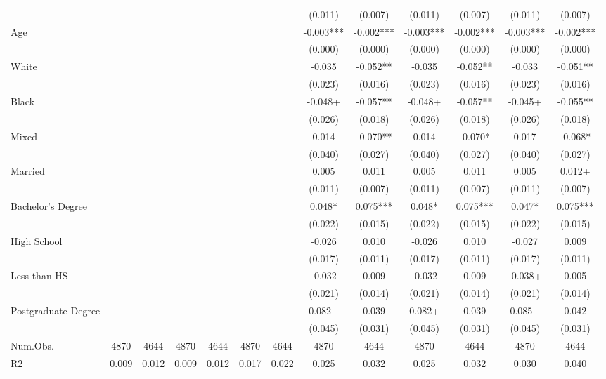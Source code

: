 \documentclass[
]{article}
\begin{document}
\begin{table}[t]
\begin{tabular*}{\linewidth}{@{\extracolsep{\fill}}lcccccccccccc}
 &  &  &  &  &  &  & (0.011) & (0.007) & (0.011) & (0.007) & (0.011) & (0.007) \\ 
Age &  &  &  &  &  &  & -0.003*** & -0.002*** & -0.003*** & -0.002*** & -0.003*** & -0.002*** \\ 
 &  &  &  &  &  &  & (0.000) & (0.000) & (0.000) & (0.000) & (0.000) & (0.000) \\ 
White &  &  &  &  &  &  & -0.035 & -0.052** & -0.035 & -0.052** & -0.033 & -0.051** \\ 
 &  &  &  &  &  &  & (0.023) & (0.016) & (0.023) & (0.016) & (0.023) & (0.016) \\ 
Black &  &  &  &  &  &  & -0.048+ & -0.057** & -0.048+ & -0.057** & -0.045+ & -0.055** \\ 
 &  &  &  &  &  &  & (0.026) & (0.018) & (0.026) & (0.018) & (0.026) & (0.018) \\ 
Mixed &  &  &  &  &  &  & 0.014 & -0.070** & 0.014 & -0.070* & 0.017 & -0.068* \\ 
 &  &  &  &  &  &  & (0.040) & (0.027) & (0.040) & (0.027) & (0.040) & (0.027) \\ 
Married &  &  &  &  &  &  & 0.005 & 0.011 & 0.005 & 0.011 & 0.005 & 0.012+ \\ 
 &  &  &  &  &  &  & (0.011) & (0.007) & (0.011) & (0.007) & (0.011) & (0.007) \\ 
Bachelor's Degree &  &  &  &  &  &  & 0.048* & 0.075*** & 0.048* & 0.075*** & 0.047* & 0.075*** \\ 
 &  &  &  &  &  &  & (0.022) & (0.015) & (0.022) & (0.015) & (0.022) & (0.015) \\ 
High School &  &  &  &  &  &  & -0.026 & 0.010 & -0.026 & 0.010 & -0.027 & 0.009 \\ 
 &  &  &  &  &  &  & (0.017) & (0.011) & (0.017) & (0.011) & (0.017) & (0.011) \\ 
Less than HS &  &  &  &  &  &  & -0.032 & 0.009 & -0.032 & 0.009 & -0.038+ & 0.005 \\ 
 &  &  &  &  &  &  & (0.021) & (0.014) & (0.021) & (0.014) & (0.021) & (0.014) \\ 
Postgraduate Degree &  &  &  &  &  &  & 0.082+ & 0.039 & 0.082+ & 0.039 & 0.085+ & 0.042 \\ 
{} & {} & {} & {} & {} & {} & {} & {(0.045)} & {(0.031)} & {(0.045)} & {(0.031)} & {(0.045)} & {(0.031)} \\ 
Num.Obs. & 4870 & 4644 & 4870 & 4644 & 4870 & 4644 & 4870 & 4644 & 4870 & 4644 & 4870 & 4644 \\ 
R2 & 0.009 & 0.012 & 0.009 & 0.012 & 0.017 & 0.022 & 0.025 & 0.032 & 0.025 & 0.032 & 0.030 & 0.040 \\ 

\end{tabular*}
\end{table}
\end{document}
